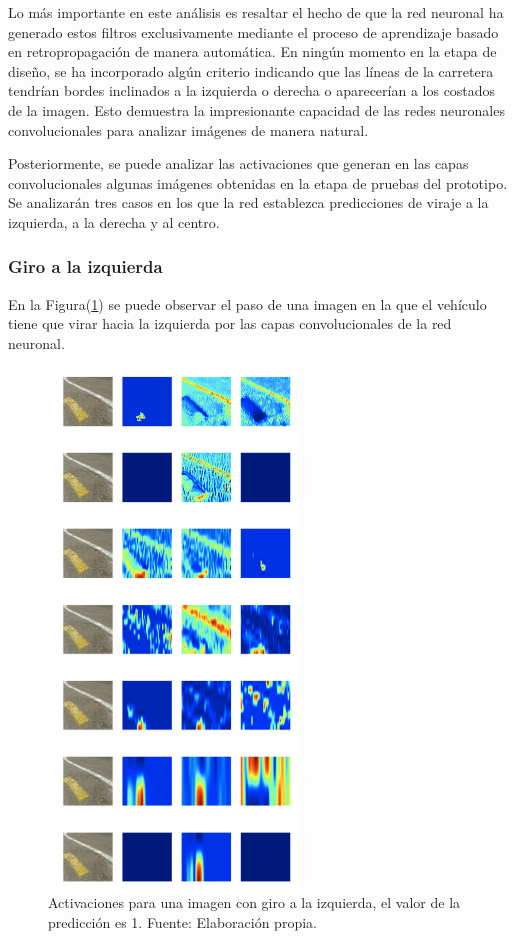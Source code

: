     Lo más importante en este análisis es resaltar el hecho de que la red neuronal ha generado estos filtros exclusivamente 
    mediante el proceso de aprendizaje basado en retropropagación de manera automática. En ningún momento en la etapa de diseño, 
    se ha incorporado algún criterio indicando que las líneas de la carretera tendrían bordes inclinados a la izquierda o derecha 
    o aparecerían a los costados de la imagen. Esto demuestra la impresionante capacidad de las redes neuronales convolucionales 
    para analizar imágenes de manera natural.

    Posteriormente, se puede analizar las activaciones que generan en las capas convolucionales algunas imágenes obtenidas 
    en la etapa de pruebas del prototipo. Se analizarán tres casos en los que la red establezca predicciones de 
    viraje a la izquierda, a la derecha y al centro.

        \subsubsection{Giro a la izquierda}
        En la Figura(\ref{fig:predizq}) se puede observar el paso de una imagen en la que el vehículo tiene que virar hacia la izquierda por 
        las capas convolucionales de la red neuronal. 

        \begin{figure}[!h] 
            \centering
            \includegraphics[width=0.60\textwidth]{img/predizq}
            \caption[Activaciones para una imagen con giro a la izquierda]{Activaciones para una imagen con giro a la izquierda, el valor de 
            la predicción es 1. Fuente: Elaboración propia. }
            \label{fig:predizq}
        \end{figure}


